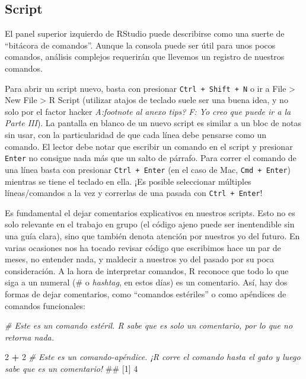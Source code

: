 \documentclass[]{book}
\newenvironment{Shaded}{\begin{snugshade}}{\end{snugshade}}
\newcommand{\DecValTok}[1]{\textcolor[rgb]{0.00,0.00,0.81}{#1}}
\newcommand{\StringTok}[1]{\textcolor[rgb]{0.31,0.60,0.02}{#1}}
\newcommand{\CommentTok}[1]{\textcolor[rgb]{0.56,0.35,0.01}{\textit{#1}}}
\newcommand{\OperatorTok}[1]{\textcolor[rgb]{0.81,0.36,0.00}{\textbf{#1}}}
\newcommand{\NormalTok}[1]{#1}
\begin{document}
\subsection{Script}\label{script}

El panel superior izquierdo de RStudio puede describirse como una suerte
de ``bitácora de comandos''. Aunque la consola puede ser útil para unos
pocos comandos, análisis complejos requerirán que llevemos un registro
de nuestros comandos.

Para abrir un script nuevo, basta con presionar
\texttt{Ctrl\ +\ Shift\ +\ N} o ir a File \textgreater{} New File
\textgreater{} R Script (utilizar atajos de teclado suele ser una buena
idea, y no solo por el factor hacker \emph{A:footnote al anexo tips?}
\emph{F: Yo creo que puede ir a la Parte III}). La pantalla en blanco de
un nuevo script es similar a un bloc de notas sin usar, con la
particularidad de que cada línea debe pensarse como un comando. El
lector debe notar que escribir un comando en el script y presionar
\texttt{Enter} no consigue nada más que un salto de párrafo. Para correr
el comando de una línea basta con presionar \texttt{Ctrl\ +\ Enter} (en
el caso de Mac, \texttt{Cmd\ +\ Enter}) mientras se tiene el teclado en
ella. ¡Es posible seleccionar múltiples líneas/comandos a la vez y
correrlas de una pasada con \texttt{Ctrl\ +\ Enter}!

Es fundamental el dejar comentarios explicativos en nuestros scripts.
Esto no es solo relevante en el trabajo en grupo (el código ajeno puede
ser inentendible sin una guía clara), sino que también denota atención
por nuestros yo del futuro. En varias ocasiones nos ha tocado revisar
código que escribimos hace un par de meses, no entender nada, y maldecir
a nuestros yo del pasado por su poca consideración. A la hora de
interpretar comandos, R reconoce que todo lo que siga a un numeral (\# o
\emph{hashtag}, en estos días) es un comentario. Así, hay dos formas de
dejar comentarios, como ``comandos estériles'' o como apéndices de
comandos funcionales:

\begin{Shaded}
\begin{Highlighting}[]
\CommentTok{# Este es un comando estéril. R sabe que es solo un comentario, por lo que no retorna nada.}
\end{Highlighting}
\end{Shaded}

\begin{Shaded}
\begin{Highlighting}[]
\DecValTok{2} \OperatorTok{+}\StringTok{ }\DecValTok{2} \CommentTok{# Este es un comando-apéndice. ¡R corre el comando hasta el gato y luego sabe que es un comentario!}
\NormalTok{## [1] 4}
\end{Highlighting}
\end{Shaded}
\end{document}
